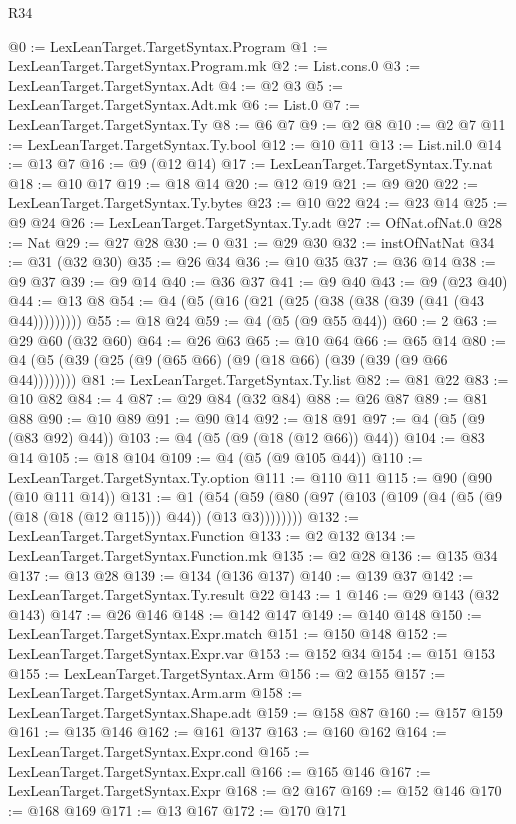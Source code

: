 \begin{lexlean}{R34}
\begin{coremodule}
@0 := LexLeanTarget.TargetSyntax.Program
@1 := LexLeanTarget.TargetSyntax.Program.mk
@2 := List.cons.{0}
@3 := LexLeanTarget.TargetSyntax.Adt
@4 := @2 @3
@5 := LexLeanTarget.TargetSyntax.Adt.mk
@6 := List.{0}
@7 := LexLeanTarget.TargetSyntax.Ty
@8 := @6 @7
@9 := @2 @8
@10 := @2 @7
@11 := LexLeanTarget.TargetSyntax.Ty.bool
@12 := @10 @11
@13 := List.nil.{0}
@14 := @13 @7
@16 := @9 (@12 @14)
@17 := LexLeanTarget.TargetSyntax.Ty.nat
@18 := @10 @17
@19 := @18 @14
@20 := @12 @19
@21 := @9 @20
@22 := LexLeanTarget.TargetSyntax.Ty.bytes
@23 := @10 @22
@24 := @23 @14
@25 := @9 @24
@26 := LexLeanTarget.TargetSyntax.Ty.adt
@27 := OfNat.ofNat.{0}
@28 := Nat
@29 := @27 @28
@30 := 0
@31 := @29 @30
@32 := instOfNatNat
@34 := @31 (@32 @30)
@35 := @26 @34
@36 := @10 @35
@37 := @36 @14
@38 := @9 @37
@39 := @9 @14
@40 := @36 @37
@41 := @9 @40
@43 := @9 (@23 @40)
@44 := @13 @8
@54 := @4 (@5 (@16 (@21 (@25 (@38 (@38 (@39 (@41 (@43 @44)))))))))
@55 := @18 @24
@59 := @4 (@5 (@9 @55 @44))
@60 := 2
@63 := @29 @60 (@32 @60)
@64 := @26 @63
@65 := @10 @64
@66 := @65 @14
@80 := @4 (@5 (@39 (@25 (@9 (@65 @66) (@9 (@18 @66) (@39 (@39 (@9 @66 @44))))))))
@81 := LexLeanTarget.TargetSyntax.Ty.list
@82 := @81 @22
@83 := @10 @82
@84 := 4
@87 := @29 @84 (@32 @84)
@88 := @26 @87
@89 := @81 @88
@90 := @10 @89
@91 := @90 @14
@92 := @18 @91
@97 := @4 (@5 (@9 (@83 @92) @44))
@103 := @4 (@5 (@9 (@18 (@12 @66)) @44))
@104 := @83 @14
@105 := @18 @104
@109 := @4 (@5 (@9 @105 @44))
@110 := LexLeanTarget.TargetSyntax.Ty.option
@111 := @110 @11
@115 := @90 (@90 (@10 @111 @14))
@131 := @1 (@54 (@59 (@80 (@97 (@103 (@109 (@4 (@5 (@9 (@18 (@18 (@12 @115))) @44)) (@13 @3))))))))
@132 := LexLeanTarget.TargetSyntax.Function
@133 := @2 @132
@134 := LexLeanTarget.TargetSyntax.Function.mk
@135 := @2 @28
@136 := @135 @34
@137 := @13 @28
@139 := @134 (@136 @137)
@140 := @139 @37
@142 := LexLeanTarget.TargetSyntax.Ty.result @22
@143 := 1
@146 := @29 @143 (@32 @143)
@147 := @26 @146
@148 := @142 @147
@149 := @140 @148
@150 := LexLeanTarget.TargetSyntax.Expr.match
@151 := @150 @148
@152 := LexLeanTarget.TargetSyntax.Expr.var
@153 := @152 @34
@154 := @151 @153
@155 := LexLeanTarget.TargetSyntax.Arm
@156 := @2 @155
@157 := LexLeanTarget.TargetSyntax.Arm.arm
@158 := LexLeanTarget.TargetSyntax.Shape.adt
@159 := @158 @87
@160 := @157 @159
@161 := @135 @146
@162 := @161 @137
@163 := @160 @162
@164 := LexLeanTarget.TargetSyntax.Expr.cond
@165 := LexLeanTarget.TargetSyntax.Expr.call
@166 := @165 @146
@167 := LexLeanTarget.TargetSyntax.Expr
@168 := @2 @167
@169 := @152 @146
@170 := @168 @169
@171 := @13 @167
@172 := @170 @171

\end{coremodule}
\end{lexlean}

